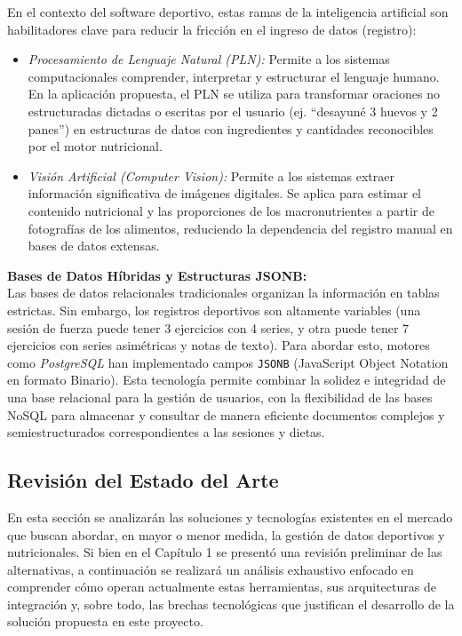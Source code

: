 \documentclass[12pt]{article}
\begin{document}
En el contexto del software deportivo, estas ramas de la inteligencia artificial son habilitadores clave para reducir la fricción en el ingreso de datos (registro):
\begin{itemize}
    \item \textit{Procesamiento de Lenguaje Natural (PLN):} Permite a los sistemas computacionales comprender, interpretar y estructurar el lenguaje humano. En la aplicación propuesta, el PLN se utiliza para transformar oraciones no estructuradas dictadas o escritas por el usuario (ej. ``desayuné 3 huevos y 2 panes'') en estructuras de datos con ingredientes y cantidades reconocibles por el motor nutricional.
    \item \textit{Visión Artificial (Computer Vision):} Permite a los sistemas extraer información significativa de imágenes digitales. Se aplica para estimar el contenido nutricional y las proporciones de los macronutrientes a partir de fotografías de los alimentos, reduciendo la dependencia del registro manual en bases de datos extensas.
\end{itemize}
\vspace{0.3cm}
\newpage
\textbf{Bases de Datos Híbridas y Estructuras JSONB:}\\
Las bases de datos relacionales tradicionales organizan la información en tablas estrictas. Sin embargo, los registros deportivos son altamente variables (una sesión de fuerza puede tener 3 ejercicios con 4 series, y otra puede tener 7 ejercicios con series asimétricas y notas de texto). Para abordar esto, motores como \textit{PostgreSQL} han implementado campos \texttt{JSONB} (JavaScript Object Notation en formato Binario). Esta tecnología permite combinar la solidez e integridad de una base relacional para la gestión de usuarios, con la flexibilidad de las bases NoSQL para almacenar y consultar de manera eficiente documentos complejos y semiestructurados correspondientes a las sesiones y dietas.
\newpage
\subsection{Revisión del Estado del Arte}
En esta sección se analizarán las soluciones y tecnologías existentes en el mercado que buscan abordar, en mayor o menor medida, la gestión de datos deportivos y nutricionales. Si bien en el Capítulo 1 se presentó una revisión preliminar de las alternativas, a continuación se realizará un análisis exhaustivo enfocado en comprender cómo operan actualmente estas herramientas, sus arquitecturas de integración y, sobre todo, las brechas tecnológicas que justifican el desarrollo de la solución propuesta en este proyecto.
\end{document}
